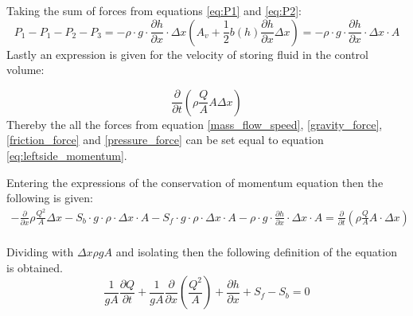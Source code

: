 Taking the sum of forces from equations \ref{eq:P1} and \ref{eq:P2}:
\begin{equation}
P_1 - P_1 -P_2 - P_3 =-\rho\cdot g \cdot \frac{\partial h}{\partial x} \cdot \Delta x \left(A_v + \frac{1}{2}b(h)\frac{\partial h}{\partial x} \Delta x \right) =-\rho\cdot g \cdot \frac{\partial h}{\partial x} \cdot \Delta x  \cdot A  
\label{pressure_force}
\end{equation}
Lastly an expression is given for the velocity of storing fluid in the control volume:

\begin{equation}\label{eq:leftside_momentum}
	\frac{\partial}{\partial t} \left(\rho \frac{Q}{A}A\Delta x\right)
\end{equation}
Thereby the all the forces from equation \ref{mass_flow_speed}, \ref{gravity_force}, \ref{friction_force} and \ref{pressure_force} can be set equal to equation \ref{eq:leftside_momentum}. 


Entering the expressions of the conservation of momentum equation then the following is given:
\\
\begin{equation}
\begin{array}{l}
- \frac{\partial}{\partial x} \rho \frac{Q^2}{A}\Delta x
-S_b \cdot g \cdot \rho \cdot \Delta x \cdot A -S_f \cdot g \cdot \rho \cdot \Delta x \cdot A  -\rho\cdot g \cdot \frac{\partial h}{\partial x} \cdot \Delta x \cdot A =\frac{\partial}{\partial t} (\rho \frac{Q}{A}A\cdot \Delta x)
\end{array}
\end{equation}
\\
Dividing with $\Delta x \rho g A$ and isolating then the following definition of the equation is obtained.
\\
\begin{equation}
\frac{1}{gA} \frac{\partial Q}{\partial t} +\frac{1}{gA}\frac{\partial}{\partial x} \left( \frac{Q^2}{A} \right) + \frac{\partial h}{\partial x} + S_f - S_b = 0
\label{saintbernard_momentum}
\end{equation}
\\


